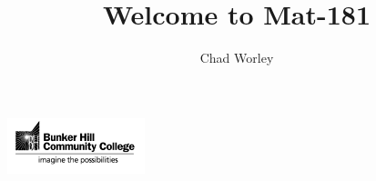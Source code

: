 \documentclass[11pt,containsverbatim,handout]{beamer}
\title[Welcome to Mat-181]{Welcome to Mat-181}
\author{Chad Worley}
\institute{Bunker Hill Community College}
\date{}
\begin{document}

{
{
\begin{frame}

\hfill \includegraphics[width=40mm]{../../BHCClogoBW}

\titlepage

\end{frame}
}
}





\end{document}
